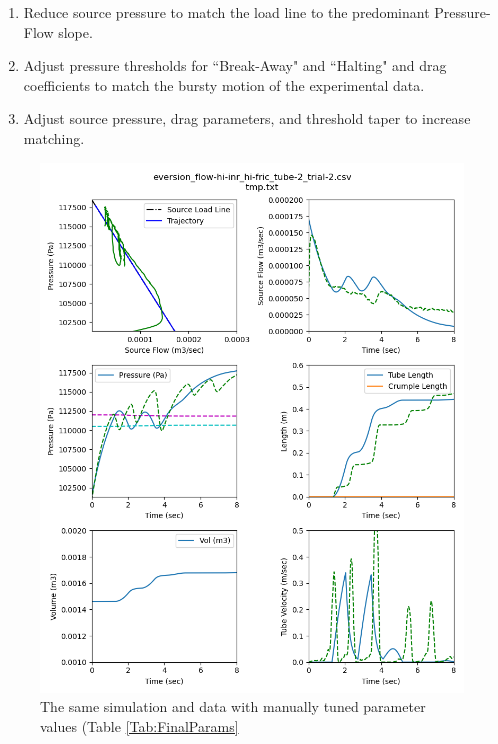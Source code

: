 \documentclass[letterpaper]{article}
\begin{document}
\begin{enumerate}
    \item Reduce source pressure to match the load line to the predominant Pressure-Flow slope.
    \item  Adjust pressure thresholds for ``Break-Away" and ``Halting" and
    drag coefficients to match the
    bursty motion of the experimental data.
    \item  Adjust source pressure, drag parameters, and threshold taper to
    increase matching.
\end{enumerate}


\begin{figure}\centering
\includegraphics[width=.75\textwidth]{Set6wFinalParms.png}
\caption{The same simulation and data with manually tuned parameter values (Table \ref{Tab:FinalParams}}
\label{Fig:FinalSimCompare}
\end{figure}
\end{document}
